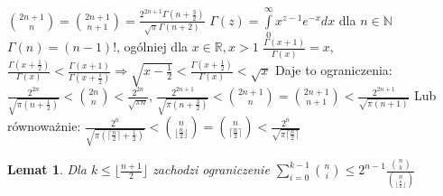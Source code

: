 \documentclass{pracamgr}
\newtheorem{lemma}[theorem]{Lemat}
\begin{document}
   ${2n+1 \choose n}={2n+1 \choose n+1}=\frac{2^{2n+1}\Gamma(n+\frac{3}{2})}{\sqrt{\pi}\Gamma(n+2)}$\newline
   $\Gamma(z)=\int\limits_{0}^{\infty}x^{z-1}e^{-x}dx$\quad
   dla $n\in\mathbb{N}$ $\Gamma(n)=(n-1)!$,\newline
   ogólniej dla $x\in\mathbb{R},x>1$ $\frac{\Gamma(x+1)}{\Gamma(x)}=x$,\quad\quad
   $\frac{\Gamma(x+\frac{1}{2})}{\Gamma(x)}<\frac{\Gamma(x+1)}{\Gamma(x+\frac{1}{2})}\Rightarrow
   \sqrt{x-\frac{1}{2}}<\frac{\Gamma(x+\frac{1}{2})}{\Gamma(x)}<\sqrt{x}$\newline
   Daje to ograniczenia:
   $\frac{2^{2n}}{\sqrt{\pi(n+\frac{1}{2})}}<{2n\choose n}<\frac{2^{2n}}{\sqrt{\pi n}}$,\quad\quad
   $\frac{2^{2n+1}}{\sqrt{\pi(n+\frac{3}{2})}}<{2n+1\choose n}={2n+1\choose n+1}<\frac{2^{2n+1}}{\sqrt{\pi(n+1)}}$\newline
   Lub równoważnie:
   $\frac{2^n}{\sqrt{\pi(\lceil\frac{n}{2}\rceil+\frac{1}{2})}}<{n\choose\lfloor\frac{n}{2}\rfloor}
   ={n\choose\lceil\frac{n}{2}\rceil}<\frac{2^n}{\sqrt{\pi\lceil\frac{n}{2}\rceil}}$
   \begin{lemma}\label{binomial sum upper bound}
    Dla $k\le\lfloor\frac{n+1}{2}\rfloor$ zachodzi ograniczenie $\sum_{i=0}^{k-1}{n\choose i}\le2^{n-1}\frac{{n\choose k}}{{n\choose \lfloor\frac{n}{2}\rfloor}}$
   \end{lemma}
\end{document}
